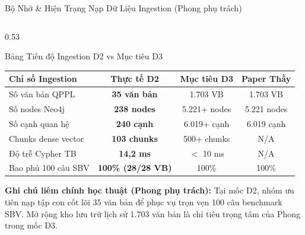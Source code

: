 \documentclass[aspectratio=169,10pt,xcolor={table}]{beamer}
\begin{document}
\begin{frame}{Bộ Nhớ \& Hiện Trạng Nạp Dữ Liệu Ingestion (Phong phụ trách)}
\begin{columns}[T]
\begin{column}{0.53\textwidth}
\begin{block}{\small Bảng Tiến độ Ingestion D2 vs Mục tiêu D3}
\centering\scriptsize
\begin{tabularx}{\linewidth}{@{}Xccc@{}}
\toprule
\textbf{Chỉ số Ingestion} & \textbf{Thực tế D2} & \textbf{Mục tiêu D3} & \textbf{Paper Thầy} \\ \midrule
Số văn bản QPPL & \textbf{35 văn bản} & 1.703 VB & 1.703 VB \\
Số nodes Neo4j & \textbf{238 nodes} & 5.221+ nodes & 5.221 nodes \\
Số cạnh quan hệ & \textbf{240 cạnh} & 6.019+ cạnh & 6.019 cạnh \\
Chunks dense vector & \textbf{103 chunks} & 500+ chunks & N/A \\
Độ trễ Cypher TB & \textbf{14,2 ms} & $<$ 10 ms & N/A \\
Bao phủ 100 câu SBV & \textbf{100\% (28/28 VB)}& 100\% & 100\% \\
\bottomrule
\end{tabularx}
\end{block}
\vskip0.05cm
\begin{tcolorbox}[colback=alertorange!8,colframe=alertorange,boxrule=0.5pt,top=2pt,bottom=2pt,left=4pt,right=4pt]
\tiny\textbf{Ghi chú liêm chính học thuật (Phong phụ trách):} Tại mốc D2, nhóm ưu tiên nạp tập con cốt lõi 35 văn bản để phục vụ trọn vẹn 100 câu benchmark SBV. Mở rộng kho lưu trữ lịch sử 1.703 văn bản là chỉ tiêu trọng tâm của Phong trong mốc D3.
\end{tcolorbox}
\end{column}
\end{columns}
\end{frame}
\end{document}
